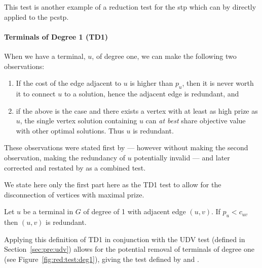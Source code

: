 This test is another example of a reduction test for the \gls{stp} which can by directly applied to
 the \gls{pcstp}.
 \paragraph{Terminals of Degree 1 (TD1)}\label{sec:pre:td1}
 When we have a terminal, $u$, of degree one, we can make the following two observations:
 \begin{enumerate}
 \item If the cost of the edge adjacent to $u$ is higher than $p_u$, then it is
   never worth it to connect $u$ to a solution, hence the adjacent edge is redundant, and
 \item if the above is the case and there exists
   a vertex with at least as high prize as $u$, the single vertex solution containing $u$
   can \textit{at best} share objective value with other optimal solutions. Thus $u$ is redundant.
 \end{enumerate}
 These observations were stated first by \citet{uchoa2006reduction} ---
 however without making the second observation,
 making the redundancy of $u$ potentially invalid
 --- and later corrected and restated by \citet{rehfeldt2016reduction} as a combined test.

 We state here only the first part here as the TD1 test to allow for the disconnection of vertices with maximal prize.
 \begin{theorem}
   Let $u$ be a terminal in $G$ of degree of 1 with adjacent edge $(u, v)$. If
   $p_u < c_{uv}$ then $(u,v)$ is redundant.
 \end{theorem}

 Applying this definition of TD1 in conjunction with the UDV test (defined in Section~\ref{sec:pre:udv})
 allows for the potential removal of terminals of degree one (see Figure~\ref{fig:red:test:deg1}), giving the
  test defined by \citet{uchoa2006reduction} and \citet{rehfeldt2016reduction}.

